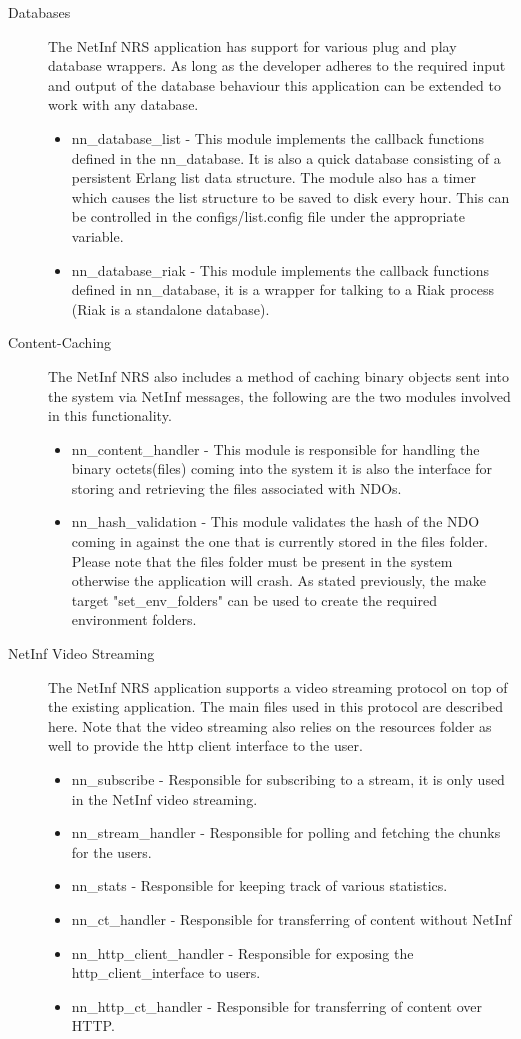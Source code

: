 \begin{description}
\item[Databases]
The NetInf NRS application has support for various plug and play database wrappers. As long as the developer adheres to the required input and output of the database behaviour this application can be extended to work with any database. 
\begin{itemize}
\item nn\_database\_list - This module implements the callback functions defined in the nn\_database. It is also a quick database consisting of a persistent Erlang list data structure. The module also has a timer which causes the list structure to be saved to disk every hour. This can be controlled in the configs/list.config file under the appropriate variable.
\item nn\_database\_riak - This module implements the callback functions defined in nn\_database, it is a wrapper for talking to a Riak process (Riak is a standalone database).
\end{itemize}
\item[Content-Caching]
The NetInf NRS also includes a method of caching binary objects sent into the system via NetInf messages, the following are the two modules involved in this functionality.
\begin {itemize}
\item nn\_content\_handler - This module is responsible for handling the binary octets(files) coming into the system it is also the interface for storing and retrieving the files associated with NDOs.
\item nn\_hash\_validation - This module validates the hash of the NDO coming in against the one that is currently stored in the files folder. Please note that the files folder must be present in the system otherwise the application will crash. As stated previously, the make target "set\_env\_folders" can be used to create the required environment folders.
\end{itemize}
\item[NetInf Video Streaming]
The NetInf NRS application supports a video streaming protocol on top of the existing application. The main files used in this protocol are described here. Note that the video streaming also relies on the resources folder as well to provide the http client interface to the user. 

\begin{itemize}
\item nn\_subscribe - Responsible for subscribing to a stream, it is only used in the NetInf video streaming.
\item nn\_stream\_handler - Responsible for polling and fetching the chunks for the users.
\item nn\_stats - Responsible for keeping track of various statistics.
\item nn\_ct\_handler - Responsible for transferring of content without NetInf
\item nn\_http\_client\_handler - Responsible for exposing the http\_client\_interface to users.
\item nn\_http\_ct\_handler - Responsible for transferring of content over HTTP.
\end{itemize}


\end{description}
